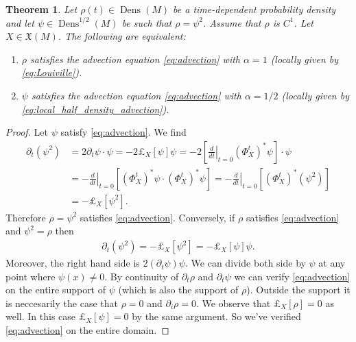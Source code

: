 \documentclass[letterpaper, 12 pt]{amsart}
\newtheorem{thm}{Theorem}[section]
\DeclareMathOperator{\Dens}{Dens}
\begin{document}
  \begin{thm} \label{thm:advection}
    Let $\rho(t) \in \Dens(M)$ be a time-dependent probability density
    and let $\psi \in \Dens^{1/2}(M)$ be such that $\rho = \psi^2$.
    Assume that $\rho$ is $C^1$.
    Let $X \in \mathfrak{X}(M)$.
    The following are equivalent:
    \begin{enumerate}
      \item $\rho$ satisfies the advection equation \eqref{eq:advection} with $\alpha = 1$ (locally given by \eqref{eq:Louiville}).
      \item $\psi$ satisfies the advection equation \eqref{eq:advection} with $\alpha = 1/2$ (locally given by \eqref{eq:local_half_density_advection}).
    \end{enumerate}
  \end{thm}
  \begin{proof}
    Let $\psi$ satisfy \eqref{eq:advection}.
    We find
    \begin{align*}
      \partial_t (\psi^2) &= 2 \partial_t\psi \cdot \psi
      =-2 \pounds_X[\psi] \psi 
      = - 2 \left[ \left.\frac{d}{dt}\right|_{t=0}
         (\Phi_X^t)^* \psi \right] \cdot \psi \\
      &= - \left. \frac{d}{dt} \right|_{t=0}
        \left[ (\Phi_X^t)^* \psi \cdot (\Phi_X^t)^* \psi \right]
      = - \left. \frac{d}{dt} \right|_{t=0}
        \left[ (\Phi_X^t)^* (\psi^2) \right] \\
      &= - \pounds_X[\psi^2].
    \end{align*}
    Therefore $\rho = \psi^2$ satisfies \eqref{eq:advection}.
    Conversely, if $\rho$ satisfies \eqref{eq:advection}
    and $\psi^2 = \rho$ then
    \begin{align*}
      \partial_t (\psi^2) = - \pounds_X[\psi^2] = - \pounds_X[\psi] \psi.
    \end{align*}
    Moreover, the right hand side is $2 (\partial_t \psi) \psi$.
    We can divide both side by $\psi$ at any point where $\psi(x) \neq 0$.
    By continuity of $\partial_t \rho$ and $\partial_t \psi$ we can
    verify \eqref{eq:advection} on the entire support of $\psi$
    (which is also the support of $\rho$).
    Outside the support it is neccesarily the case that
    $\rho = 0$ and  $\partial_i \rho = 0$.
    We observe that $\pounds_X[\rho] = 0$ as well.
    In this case $\pounds_X[\psi] = 0$ by the same argument.
    So we've verified \eqref{eq:advection} on the entire domain.
  \end{proof}
\end{document}
